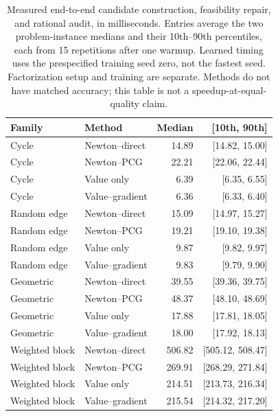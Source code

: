 \begin{table}[p]
\centering\small
\caption{Measured end-to-end candidate construction, feasibility repair, and rational audit, in milliseconds. Entries average the two problem-instance medians and their 10th--90th percentiles, each from 15 repetitions after one warmup. Learned timing uses the prespecified training seed zero, not the fastest seed. Factorization setup and training are separate. Methods do not have matched accuracy; this table is not a speedup-at-equal-quality claim.}
\label{tab:r10-timing}
\begin{tabular}{llrr}\toprule
Family & Method & Median & [10th, 90th]\\\midrule
Cycle & Newton--direct & 14.89 & [14.82, 15.00] \\
Cycle & Newton--PCG & 22.21 & [22.06, 22.44] \\
Cycle & Value only & 6.39 & [6.35, 6.55] \\
Cycle & Value--gradient & 6.36 & [6.33, 6.40] \\
Random edge & Newton--direct & 15.09 & [14.97, 15.27] \\
Random edge & Newton--PCG & 19.21 & [19.10, 19.38] \\
Random edge & Value only & 9.87 & [9.82, 9.97] \\
Random edge & Value--gradient & 9.83 & [9.79, 9.90] \\
Geometric & Newton--direct & 39.55 & [39.36, 39.75] \\
Geometric & Newton--PCG & 48.37 & [48.10, 48.69] \\
Geometric & Value only & 17.88 & [17.81, 18.05] \\
Geometric & Value--gradient & 18.00 & [17.92, 18.13] \\
Weighted block & Newton--direct & 506.82 & [505.12, 508.47] \\
Weighted block & Newton--PCG & 269.91 & [268.29, 271.84] \\
Weighted block & Value only & 214.51 & [213.73, 216.34] \\
Weighted block & Value--gradient & 215.54 & [214.32, 217.20] \\
\bottomrule\end{tabular}
\end{table}
